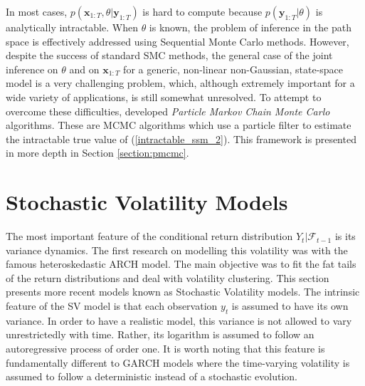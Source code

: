 \documentclass[11pt,a4,twosided,singlespacing,titlepagenumber=on]{scrreprt}
\numberwithin{equation}{chapter} %
\theoremstyle{remark}
\newcommand{\matr}[1]{\mathbf{#1}}
\begin{document}
In most cases, $p(\matr{x}_{1:T}, \theta | \matr{y}_{1:T})$ is hard to compute because $p(\matr{y}_{1:T} | \theta)$ is analytically intractable. When $\theta$ is known, the problem of inference in the path space is effectively addressed using Sequential Monte Carlo methods. However, despite the success of standard SMC methods, the general case of the joint inference on $\theta$ and on $\matr{x}_{1:T}$ for a generic, non-linear non-Gaussian, state-space model is a very challenging problem, which, although extremely important for a wide variety of applications, is still somewhat unresolved. To attempt to overcome these difficulties, \cite{andrieu2010} developed \textit{Particle Markov Chain Monte Carlo} algorithms. These are MCMC algorithms which use a particle filter to estimate the intractable true value of (\ref{intractable_ssm_2}). This framework is presented in more depth in Section \ref{section:pmcmc}.

\section{Stochastic Volatility Models}
\label{sec:sv}
The most important feature of the conditional return distribution $Y_t | \mathcal{F}_{t-1}$ is its variance dynamics. The first research on modelling this volatility was \cite{engle1982} with the famous heteroskedastic ARCH model. The main objective was to fit the fat tails of the return distributions and deal with volatility clustering. This section presents more recent models known as Stochastic Volatility models. The intrinsic feature of the SV model is that each observation $y_t$ is assumed to have its own variance. In order to have a realistic model, this variance is not allowed to vary unrestrictedly with time. Rather, its logarithm is assumed to follow an autoregressive process of order one. It is worth noting that this feature is fundamentally different to GARCH models where the time-varying volatility is assumed to follow a deterministic instead of a stochastic evolution.
\end{document}
